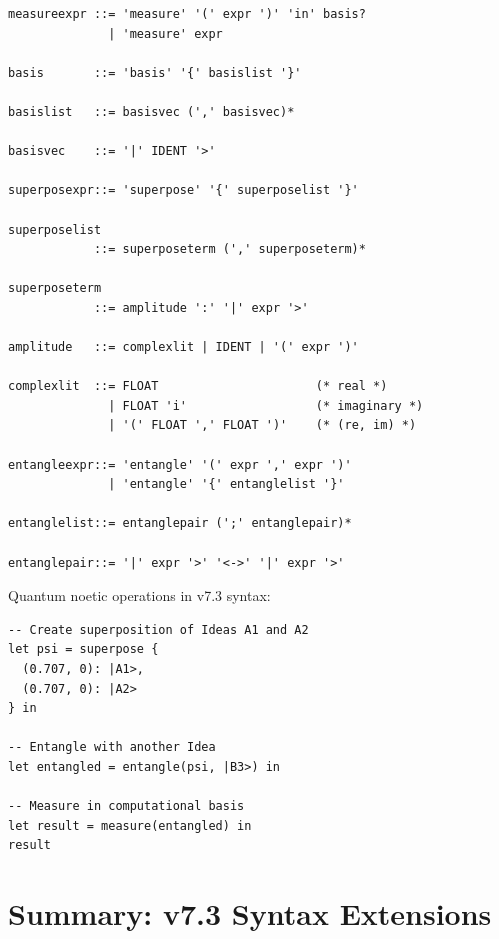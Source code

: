 \begin{definition}
\label{def:quantum-op-grammar}
\begin{lstlisting}[style=bnf,caption={Quantum Operation Grammar}]
measureexpr ::= 'measure' '(' expr ')' 'in' basis?
              | 'measure' expr

basis       ::= 'basis' '{' basislist '}'

basislist   ::= basisvec (',' basisvec)*

basisvec    ::= '|' IDENT '>'

superposexpr::= 'superpose' '{' superposelist '}'

superposelist
            ::= superposeterm (',' superposeterm)*

superposeterm
            ::= amplitude ':' '|' expr '>'

amplitude   ::= complexlit | IDENT | '(' expr ')'

complexlit  ::= FLOAT                      (* real *)
              | FLOAT 'i'                  (* imaginary *)
              | '(' FLOAT ',' FLOAT ')'    (* (re, im) *)

entangleexpr::= 'entangle' '(' expr ',' expr ')'
              | 'entangle' '{' entanglelist '}'

entanglelist::= entanglepair (';' entanglepair)*

entanglepair::= '|' expr '>' '<->' '|' expr '>'
\end{lstlisting}
\end{definition}

\begin{example}
\label{ex:quantum-ops}
Quantum noetic operations in v7.3 syntax:
\begin{verbatim}
-- Create superposition of Ideas A1 and A2
let psi = superpose {
  (0.707, 0): |A1>,
  (0.707, 0): |A2>
} in

-- Entangle with another Idea
let entangled = entangle(psi, |B3>) in

-- Measure in computational basis
let result = measure(entangled) in
result
\end{verbatim}
\end{example}

\section{Summary: v7.3 Syntax Extensions}
\label{sec:syntax-summary}

